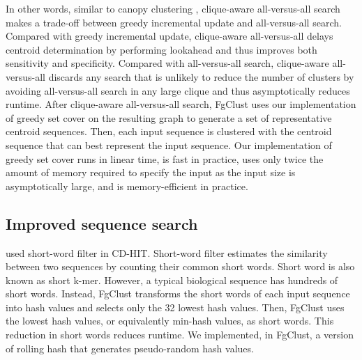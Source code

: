 \documentclass[11pt,letterpaper]{article}
\begin{document}
In other words, similar to canopy clustering \citep{mccallum2000efficient}, clique-aware all-versus-all search makes a trade-off between greedy incremental update and all-versus-all search. Compared with greedy incremental update, clique-aware all-versus-all delays centroid determination by performing lookahead and thus improves both sensitivity and specificity.
Compared with all-versus-all search, clique-aware all-versus-all discards any search that is unlikely to reduce the number of clusters by avoiding all-versus-all search in any large clique and thus asymptotically reduces runtime.
After clique-aware all-versus-all search, FgClust uses our implementation of greedy set cover on the resulting graph to generate a set of representative centroid sequences.
Then, each input sequence is clustered with the centroid sequence that can best represent the input sequence.
Our implementation of greedy set cover runs in linear time, is fast in practice, uses only twice the amount of memory required to specify the input as the input size is asymptotically large, and is memory-efficient in practice.

\subsection{Improved sequence search}

 used short-word filter in CD-HIT.
Short-word filter estimates the similarity between two sequences by counting their common short words.
Short word is also known as short k-mer.
However, a typical biological sequence has hundreds of short words.
Instead, FgClust transforms the short words of each input sequence into hash values and selects only the 32 lowest hash values.
Then, FgClust uses the lowest hash values, or equivalently min-hash values, as short words.
This reduction in short words reduces runtime.
We implemented, in FgClust, a version of rolling hash that generates pseudo-random hash values.
\end{document}
